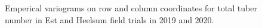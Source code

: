 \begin{figure}[H]

{\centering {}

}

\caption{Emperical variograms on row and column coordinates for total
tuber number in Est and Heelsum field trials in 2019 and 2020.}

\end{figure}%


